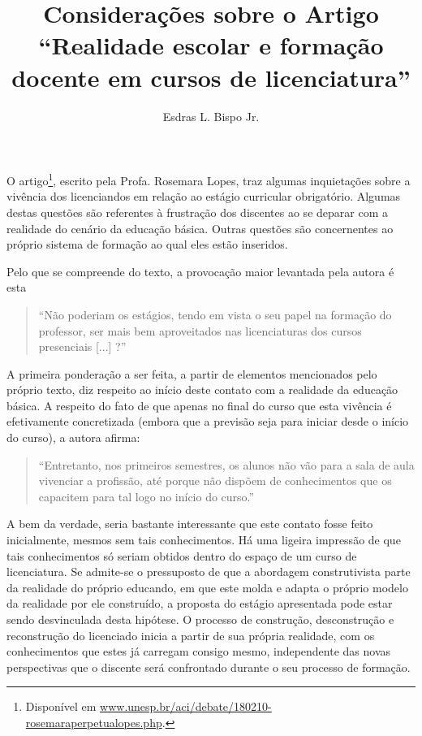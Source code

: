\documentclass[12pt]{article}
\title{Considerações sobre o Artigo ``Realidade escolar e formação docente em cursos de licenciatura''}
\author{Esdras L. Bispo Jr.\inst{1,2}}
\begin{document}
 

\maketitle


O artigo\footnote{Disponível em \url{www.unesp.br/aci/debate/180210-rosemaraperpetualopes.php}.}, escrito pela Profa. Rosemara Lopes, traz algumas inquietações sobre a vivência dos licenciandos em relação ao estágio curricular obrigatório. Algumas destas questões são referentes à frustração dos discentes ao se deparar com a realidade do cenário da educação básica. Outras questões são concernentes ao próprio sistema de formação ao qual eles estão inseridos.

Pelo que se compreende do texto, a provocação maior levantada pela autora é esta
\begin{quote}
\sc ``Não poderiam os estágios, tendo em vista o seu papel na formação do professor, ser mais bem aproveitados nas licenciaturas dos cursos presenciais [...] ?''	
\end{quote}

A primeira ponderação a ser feita, a partir de elementos mencionados pelo próprio texto, diz respeito ao início deste contato com a realidade da educação básica. A respeito do fato de que apenas no final do curso que esta vivência é efetivamente concretizada (embora que a previsão seja para iniciar desde o início do curso), a autora afirma:
\begin{quote}
	\sc
``Entretanto, nos primeiros semestres, os alunos não vão para a sala de aula vivenciar a profissão, até porque não dispõem de conhecimentos que os capacitem para tal logo no início do curso.''
\end{quote}
A bem da verdade, seria bastante interessante que este contato fosse feito inicialmente, mesmos sem tais conhecimentos. Há uma ligeira impressão de que tais conhecimentos só seriam obtidos dentro do espaço de um curso de licenciatura. Se admite-se o pressuposto de que a abordagem construtivista parte da realidade do próprio educando, em que este molda e adapta o próprio modelo da realidade por ele construído, a proposta do estágio apresentada pode estar sendo desvinculada desta hipótese. O processo de construção, desconstrução e reconstrução do licenciado inicia a partir de sua própria realidade, com os conhecimentos que estes já carregam consigo mesmo, independente das novas perspectivas que o discente será confrontado durante o seu processo de formação.
\end{document}
